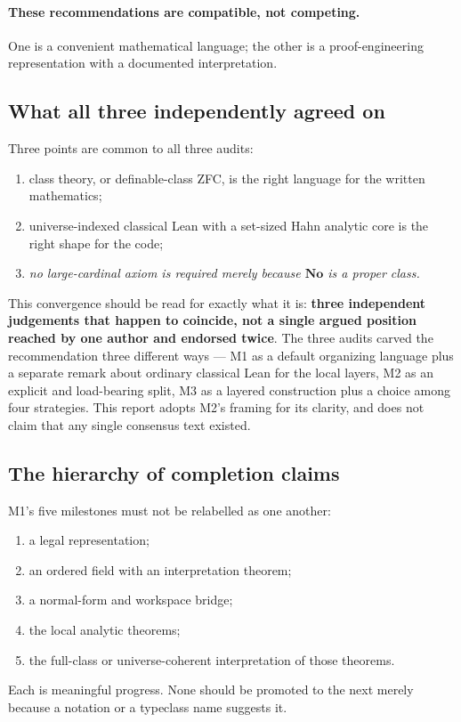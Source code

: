 \documentclass[11pt,letterpaper]{article}
\numberwithin{equation}{section}
\theoremstyle{definition}
\theoremstyle{remark}
\newcommand{\No}{\mathbf{No}}
\begin{document}
\paragraph{These recommendations are compatible, not competing.} One is a
convenient mathematical language; the other is a proof-engineering
representation with a documented interpretation.

\subsection{What all three independently agreed on}
\label{found:sub:convergence}
Three points are common to all three audits:
\begin{enumerate}
\item class theory, or definable-class ZFC, is the right language for the
written mathematics;
\item universe-indexed classical Lean with a set-sized Hahn analytic core is the
right shape for the code;
\item \emph{no large-cardinal axiom is required merely because $\No$ is a proper
class.}
\end{enumerate}

This convergence should be read for exactly what it is: \textbf{three
independent judgements that happen to coincide, not a single argued position
reached by one author and endorsed twice}. The three audits carved the
recommendation three different ways --- M1 as a default organizing language plus
a separate remark about ordinary classical Lean for the local layers, M2 as an
explicit and load-bearing split, M3 as a layered construction plus a choice among
four strategies. This report adopts M2's framing for its clarity, and does not
claim that any single consensus text existed.

\subsection{The hierarchy of completion claims}
\label{found:sub:milestones}
M1's five milestones must not be relabelled as one another:
\begin{enumerate}
\item a legal representation;
\item an ordered field with an interpretation theorem;
\item a normal-form and workspace bridge;
\item the local analytic theorems;
\item the full-class or universe-coherent interpretation of those theorems.
\end{enumerate}
Each is meaningful progress. None should be promoted to the next merely because
a notation or a typeclass name suggests it.
\end{document}
